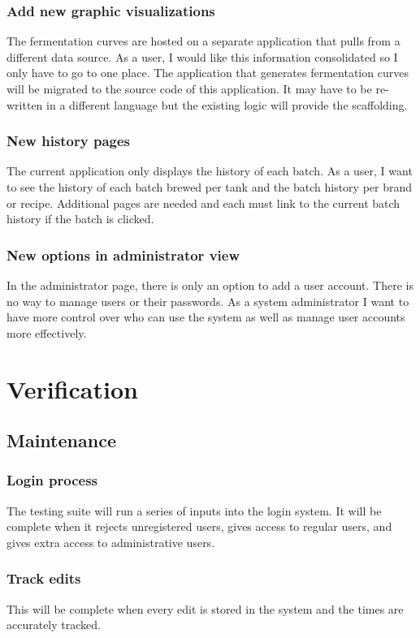         \subsubsection{Add new graphic visualizations}
        The fermentation curves are hosted on a separate application that pulls from a different data source. As a user, I would like this information consolidated so I only have to go to one place. The application that generates fermentation curves will be migrated to the source code of this application. It may have to be re-written in a different language but the existing logic will provide the scaffolding. 
        \subsubsection{New history pages}
        The current application only displays the history of each batch. As a user, I want to see the history of each batch brewed per tank and the batch history per brand or recipe. Additional pages are needed and each must link to the current batch history if the batch is clicked.  
        \subsubsection{New options in administrator view}
        In the administrator page, there is only an option to add a user account. There is no way to manage users or their passwords. As a system administrator I want to have more control over who can use the system as well as manage user accounts more effectively. 

\section{Verification}
    \subsection{Maintenance}
        \subsubsection{Login process}
            The testing suite will run a series of inputs into the login system. It will be complete when it rejects unregistered users, gives access to regular users, and gives extra access to administrative users.
        \subsubsection{Track edits}
            This will be complete when every edit is stored in the system and the times are accurately tracked.
